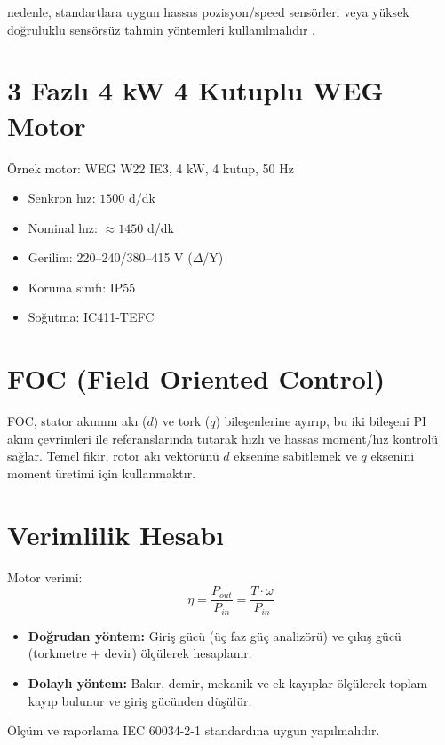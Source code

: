 nedenle, standartlara uygun hassas pozisyon/speed sensörleri veya yüksek doğruluklu sensörsüz tahmin yöntemleri kullanılmalıdır \cite{macdonald1979dq}. \section{3 Fazlı 4 kW 4 Kutuplu WEG Motor} Örnek motor: WEG W22 IE3, 4 kW, 4 kutup, 50 Hz \begin{itemize} \item Senkron hız: $1500$ d/dk \item Nominal hız: $\approx 1450$ d/dk \item Gerilim: 220–240/380–415 V ($\Delta$/Y) \item Koruma sınıfı: IP55 \item Soğutma: IC411-TEFC \end{itemize} \section{FOC (Field Oriented Control)} FOC, stator akımını akı ($d$) ve tork ($q$) bileşenlerine ayırıp, bu iki bileşeni PI akım çevrimleri ile referanslarında tutarak hızlı ve hassas moment/hız kontrolü sağlar. Temel fikir, rotor akı vektörünü $d$ eksenine sabitlemek ve $q$ eksenini moment üretimi için kullanmaktır. \section{Verimlilik Hesabı} Motor verimi: \begin{equation} \eta = \frac{P_{out}}{P_{in}} = \frac{T \cdot \omega}{P_{in}} \end{equation} \begin{itemize} \item \textbf{Doğrudan yöntem:} Giriş gücü (üç faz güç analizörü) ve çıkış gücü (torkmetre + devir) ölçülerek hesaplanır. \item \textbf{Dolaylı yöntem:} Bakır, demir, mekanik ve ek kayıplar ölçülerek toplam kayıp bulunur ve giriş gücünden düşülür. \end{itemize} Ölçüm ve raporlama IEC 60034-2-1 standardına uygun yapılmalıdır.

\clearpage
